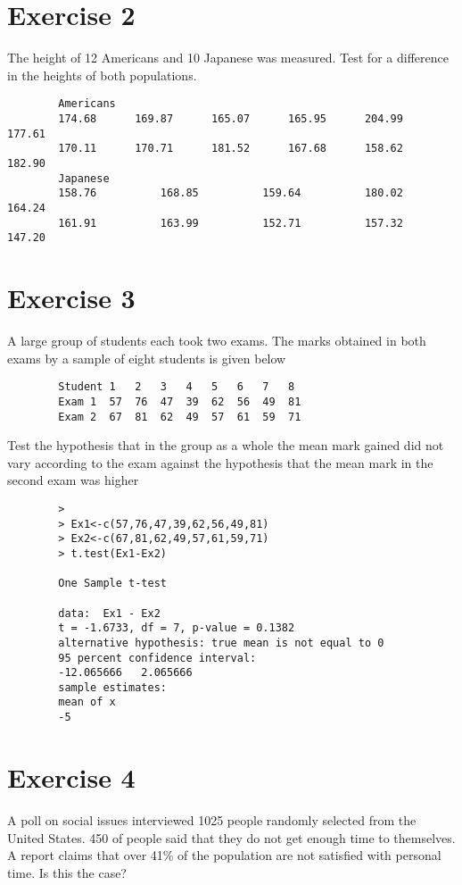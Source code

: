 \documentclass[a4paper,12pt]{article}
\begin{document}
\begin{itemize}
\begin{verbatim}
		\end{verbatim}
		\section{Exercise 2} 
		The height of 12 Americans and 10 Japanese was measured. Test for a difference in the heights of both populations.
		\begin{verbatim}
		Americans
		174.68   	169.87 	   	165.07    	165.95 		204.99 		177.61 	
		170.11 	 	170.71 	   	181.52 		167.68 		158.62 		182.90
		Japanese
		158.76  		168.85  		159.64  		180.02  		164.24
		161.91  		163.99  		152.71  		157.32  		147.20
		\end{verbatim}
		
		
		\section{Exercise 3}
		
		A large group of students each took two exams. The marks obtained in both exams by a sample of eight students is given below
		
		\begin{verbatim}
		Student	1	2	3	4	5	6	7	8
		Exam 1	57	76	47	39	62	56	49	81
		Exam 2	67	81	62	49	57	61	59	71
		\end{verbatim}
		Test the hypothesis that in the group as a whole the mean mark gained did not vary according to the exam against the hypothesis that the mean mark in the second exam was higher
		\begin{verbatim}
		>
		> Ex1<-c(57,76,47,39,62,56,49,81)
		> Ex2<-c(67,81,62,49,57,61,59,71)
		> t.test(Ex1-Ex2)
		
		One Sample t-test
		
		data:  Ex1 - Ex2
		t = -1.6733, df = 7, p-value = 0.1382
		alternative hypothesis: true mean is not equal to 0
		95 percent confidence interval:
		-12.065666   2.065666
		sample estimates:
		mean of x
		-5
		\end{verbatim}
		
		\section{Exercise 4}
		A poll on social issues interviewed 1025 people randomly selected from the United States. 450 of people said that they do not get enough time to themselves. A report claims that over 41\% of the population are not satisfied with personal time. Is this the case?
		

\end{itemize}
\end{document}

